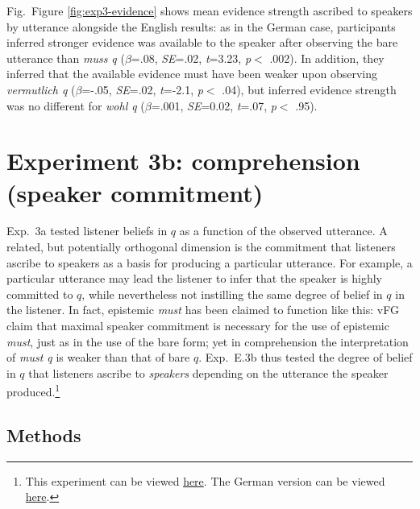 \documentclass[11pt]{article}
\newcommand{\figref}[1]{Figure \ref{#1}}
\begin{document}
Fig.~\figref{fig:exp3-evidence} shows mean evidence strength ascribed to speakers by utterance alongside the English results: as in the German case, participants inferred stronger evidence was available to the speaker after observing the bare utterance than \emph{muss q} ($\beta$=.08, \emph{SE}=.02, \emph{t}=3.23, \emph{p}$<$ .002). In addition, they inferred that the available evidence must have been weaker upon observing \emph{vermutlich q} ($\beta$=-.05, \emph{SE}=.02, \emph{t}=-2.1, \emph{p}$<$ .04), but inferred evidence strength was no different for \emph{wohl q} ($\beta$=.001, \emph{SE}=0.02, \emph{t}=.07, \emph{p}$<$ .95).

\section{Experiment 3b: comprehension (speaker commitment)}


Exp.~3a tested listener beliefs in $q$ as a function of the observed utterance. A related, but potentially orthogonal dimension is the commitment that listeners ascribe to speakers as a basis for producing a particular utterance. For example, a particular utterance may lead the listener to infer that the speaker is highly committed to $q$, while nevertheless not instilling the same degree of belief in $q$ in the listener. In fact, epistemic \emph{must} has been claimed to function like this: vFG claim that maximal speaker commitment is necessary for the use of epistemic \emph{must}, just as in the use of the bare form; yet in comprehension the interpretation of \emph{must q} is weaker than that of bare $q$.  Exp.~E.3b thus tested the degree of belief in $q$ that listeners ascribe to \emph{speakers} depending on the utterance the speaker produced.\footnote{This experiment can be viewed \href{http://stanford.edu/~jdegen/80_modals_comprehension_speakerbelief/modals.html}{here}. The German version can be viewed \href{http://web.stanford.edu/~jdegen/cgi-bin/1_dp_comprehension_speakerbelief/discourse_particles.html}{here}.}

\subsection{Methods}
\end{document}
